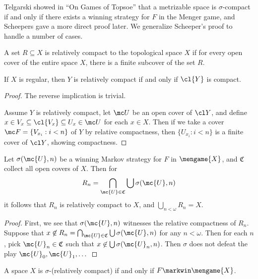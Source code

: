   Telgarski showed in ``On Games of Topsoe'' that a metrizable space is $\sigma$-compact if and only if there exists a winning strategy for $F$ in the Menger game, and Scheepers gave a more direct proof later. We generalize Scheeper's proof to handle a number of cases.

  \begin{defn}
    A set $R\subseteq X$ is relatively compact to the topological space $X$ if for every open cover of the entire space $X$, there is a finite subcover of the set $R$.
  \end{defn}

  \begin{prop}
    If $X$ is regular, then $Y$ is relatively compact if and only if $\cl{Y}$ is compact.
  \end{prop}

  \begin{proof}
    The reverse implication is trivial. 

    Assume $Y$ is relatively compact, let $\mc U$ be an open cover of $\cl Y$, and define $x\in V_x\subseteq \cl{V_x}\subseteq U_x \in \mc U$ for each $x\in X$. Then if we take a cover $\mc F = \{V_{x_i} : i<n\}$ of $Y$ by relative compactness, then $\{U_{x_i}:i<n\}$ is a finite cover of $\cl Y$, showing compactness.
  \end{proof}

  \begin{lem}
    Let $\sigma(\mc{U}, n)$ be a winning Markov strategy for $F$ in $\mengame{X}$, and $\mathfrak{C}$ collect all open covers of $X$. Then for
      \[
        R_n = \bigcap_{\mc{U}\in\mathfrak{C}} \bigcup\sigma(\mc{U},n)
      \]
    it follows that $R_n$ is relatively compact to $X$, and $\bigcup_{n<\omega} R_n = X$.
  \end{lem}

  \begin{proof}
    First, we see that $\sigma(\mc{U},n)$ witnesses the relative compactness of $R_n$. Suppose that $x \not\in R_n = \bigcap_{\mc{U}\in\mathfrak{C}} \bigcup\sigma(\mc{U},n)$ for any $n<\omega$. Then for each $n$, pick $\mc{U}_n\in\mathfrak{C}$ such that $x\not\in \bigcup\sigma(\mc{U}_n,n)$. Then $\sigma$ does not defeat the play $\mc{U}_0,\mc{U}_1,\dots$
  \end{proof}

  \begin{cor}
    A space $X$ is $\sigma$-(relatively compact) if and only if $F \markwin \mengame{X}$.
  \end{cor}

